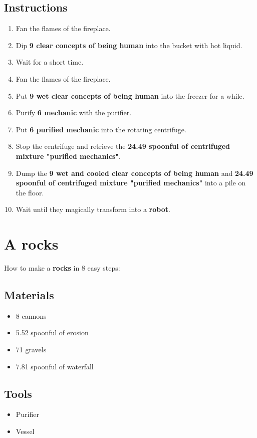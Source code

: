 \documentclass{article}
\begin{document}
\subsection{Instructions}\begin{enumerate}
\item 
Fan the flames of the fireplace.
\item 
Dip \textbf{9 clear concepts of being human} into the bucket with hot liquid.
\item 
Wait for a short time.
\item 
Fan the flames of the fireplace.
\item 
Put \textbf{9 wet clear concepts of being human} into the freezer for a while.
\item 
Purify \textbf{6 mechanic} with the purifier.
\item 
Put \textbf{6 purified mechanic} into the rotating centrifuge.
\item 
Stop the centrifuge and retrieve the \textbf{24.49 spoonful of centrifuged mixture "purified mechanics"}.
\item 
Dump the \textbf{9 wet and cooled clear concepts of being human} and \textbf{24.49 spoonful of centrifuged mixture "purified mechanics"} into a pile on the floor.
\item 
Wait until they magically transform into a \textbf{robot}.
\end{enumerate}
\newpage
\section{A rocks}How to make a \textbf{rocks} in 8 easy steps:

\subsection{Materials}\begin{itemize}
\item 
8 cannons
\item 
5.52 spoonful of erosion
\item 
71 gravels
\item 
7.81 spoonful of waterfall
\end{itemize}
\subsection{Tools}\begin{itemize}
\item 
Purifier
\item 
Vessel
\end{itemize}
\end{document}
